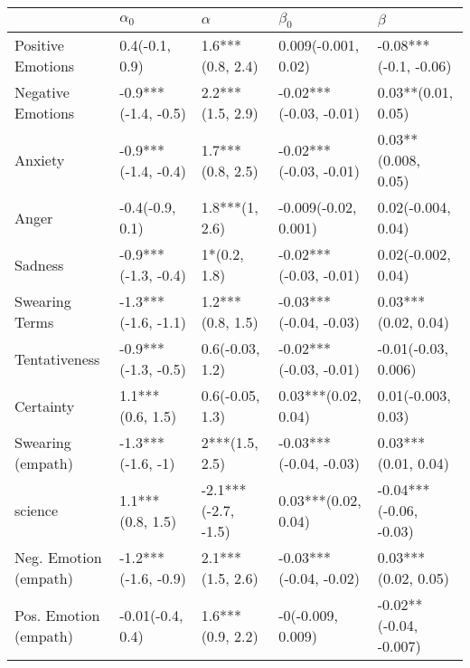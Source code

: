 \begin{tabular}{lllll}
\toprule
{} &           $\alpha_0$ &             $\alpha$ &               $\beta_0$ &                 $\beta$ \\
\midrule
Positive Emotions     &       0.4(-0.1, 0.9) &     1.6***(0.8, 2.4) &     0.009(-0.001, 0.02) &   -0.08***(-0.1, -0.06) \\
Negative Emotions     &  -0.9***(-1.4, -0.5) &     2.2***(1.5, 2.9) &  -0.02***(-0.03, -0.01) &      0.03**(0.01, 0.05) \\
Anxiety               &  -0.9***(-1.4, -0.4) &     1.7***(0.8, 2.5) &  -0.02***(-0.03, -0.01) &     0.03**(0.008, 0.05) \\
Anger                 &      -0.4(-0.9, 0.1) &       1.8***(1, 2.6) &    -0.009(-0.02, 0.001) &      0.02(-0.004, 0.04) \\
Sadness               &  -0.9***(-1.3, -0.4) &         1*(0.2, 1.8) &  -0.02***(-0.03, -0.01) &      0.02(-0.002, 0.04) \\
Swearing Terms        &  -1.3***(-1.6, -1.1) &     1.2***(0.8, 1.5) &  -0.03***(-0.04, -0.03) &     0.03***(0.02, 0.04) \\
Tentativeness         &  -0.9***(-1.3, -0.5) &      0.6(-0.03, 1.2) &  -0.02***(-0.03, -0.01) &     -0.01(-0.03, 0.006) \\
Certainty             &     1.1***(0.6, 1.5) &      0.6(-0.05, 1.3) &     0.03***(0.02, 0.04) &      0.01(-0.003, 0.03) \\
Swearing (empath)     &    -1.3***(-1.6, -1) &       2***(1.5, 2.5) &  -0.03***(-0.04, -0.03) &     0.03***(0.01, 0.04) \\
science               &     1.1***(0.8, 1.5) &  -2.1***(-2.7, -1.5) &     0.03***(0.02, 0.04) &  -0.04***(-0.06, -0.03) \\
Neg. Emotion (empath) &  -1.2***(-1.6, -0.9) &     2.1***(1.5, 2.6) &  -0.03***(-0.04, -0.02) &     0.03***(0.02, 0.05) \\
Pos. Emotion (empath) &     -0.01(-0.4, 0.4) &     1.6***(0.9, 2.2) &       -0(-0.009, 0.009) &  -0.02**(-0.04, -0.007) \\
\bottomrule
\end{tabular}
